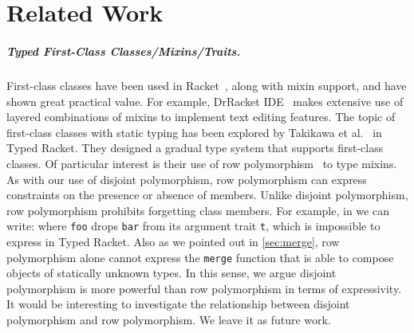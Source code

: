 \section{Related Work}
\label{sec:related}


\subparagraph{Typed First-Class Classes/Mixins/Traits.}
First-class classes have been used in
Racket~\cite{DBLP:conf/aplas/FlattFF06}, along with mixin support, and
have shown great practical value. For example, DrRacket
IDE~\cite{DBLP:journals/jfp/FindlerCFFKSF02} makes extensive use of layered
combinations of mixins to implement text editing features. The topic of
first-class classes with static typing has been explored by Takikawa et
al.~\cite{DBLP:conf/oopsla/TakikawaSDTF12} in Typed Racket. They designed a
gradual type system that supports first-class classes. Of particular interest is
their use of row polymorphism~\cite{wand1994type} to type mixins.
As with our use of disjoint polymorphism, row polymorphism can express
constraints on the presence or absence of members. Unlike disjoint polymorphism,
row polymorphism prohibits forgetting class members.
For example, in \name we can write:
where \lstinline{foo} drops \lstinline{bar} from its argument trait \lstinline{t},
which is impossible to express in Typed Racket. Also as we pointed out in \cref{sec:merge}, row polymorphism
alone cannot express the \lstinline{merge} function that is able to compose objects of statically unknown types.
In this sense, we argue disjoint polymorphism is more powerful than row polymorphism in terms of expressivity.
It would be interesting to investigate the relationship between disjoint polymorphism and row polymorphism. We leave it
as future work.



